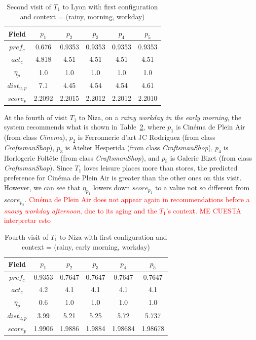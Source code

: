 \begin{table}[h!]
    \centering
        \caption{Second visit of $T_1$ to Lyon with first configuration and context = (rainy, morning, workday)}
    \label{table:t1-3}
    \begin{tabular}{ |c|c|c|c|c|c| } 
        \hline
        Field   & $p_1$ & $p_2$ & $p_3$ & $p_4$ & $p_5$ \\
        \hline
        $pref_c$    & 0.676 & 0.9353 & 0.9353 & 0.9353 & 0.9353 \\
        $act_c$     & 4.818 & 4.51 & 4.51 & 4.51 & 4.51 \\
        $\eta_p$    & 1.0 & 1.0 & 1.0 & 1.0 & 1.0 \\
        $dist_{u,p}$ & 7.1 & 4.45 & 4.54 & 4.54 & 4.61 \\
        $score_p$    & 2.2092 & 2.2015 & 2.2012 & 2.2012 & 2.2010 \\
        
        \hline
    \end{tabular}
\end{table}


At the fourth of  visit  $T_1$ to Niza, on a {\it rainy workday in the early morning}, the system recommends what is shown in Table~\ref{table:t1-2}, where $p_1$ is Cinéma de Plein Air (from class \textit{Cinema}), $p_2$ is Ferronnerie d'art JC Rodriguez (from class \textit{CraftsmanShop}), $p_3$ is Atelier Hesperida (from class \textit{CraftsmanShop}), $p_4$ is Horlogerie Foltête	(from class \textit{CraftsmanShop}), and $p_5$ is Galerie Bizet (from class \textit{CraftsmanShop}). Since $T_1$ loves leisure places more than stores, the predicted preference for Cinéma de Plein Air is greater than the other ones on this visit. However, we can see that $\eta_{p_1}$ lowers down $score_{p_1}$ to a value not so different from $score_{p_2}$. \textcolor{red}{Cinéma de Plein Air does not appear again in recommendations before a {\it snowy workday afternoon}, due to its aging and the $T_1$'s context. ME CUESTA interpretar esto}

\begin{table}[h!]
    \centering
    \caption{Fourth visit of $T_1$ to Niza with first configuration and context = (rainy, early morning, workday)}
    \label{table:t1-2}
    \begin{tabular}{ |c|c|c|c|c|c| } 
        \hline
        Field   & $p_1$ & $p_2$ & $p_3$ & $p_4$ & $p_5$ \\
        \hline
        $pref_c$    &  0.9353 & 0.7647 & 0.7647 & 0.7647 & 0.7647 \\
        $act_c$     & 4.2 & 4.1 & 4.1 & 4.1 & 4.1 \\
        $\eta_p$    & 0.6 & 1.0 & 1.0 & 1.0 & 1.0 \\
        $dist_{u,p}$ & 3.99 & 5.21 & 5.25 & 5.72 & 5.737 \\
        $score_p$    & 1.9906 & 1.9886 & 1.9884 & 1.98684 & 1.98678 \\
        \hline
    \end{tabular}
\end{table}

